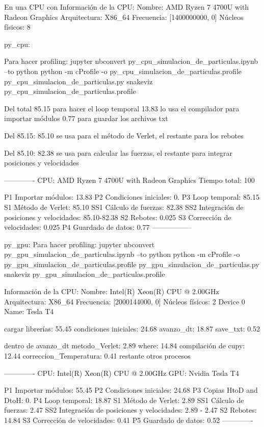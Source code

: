 \documentclass[aps,prb,twocolumn,superscriptaddress,floatfix,longbibliography]{revtex4-2}
\newcounter{para}
\begin{document}
\begin{itemize}
En una CPU con
Información de la CPU:
Nombre: AMD Ryzen 7 4700U with Radeon Graphics
Arquitectura: X86_64
Frecuencia: [1400000000, 0]
Núcleos físicos: 8

py_cpu:

Para hacer profiling:
jupyter nbconvert py_cpu_simulacion_de_particulas.ipynb --to python
python -m cProfile -o py_cpu_simulacion_de_particulas.profile py_cpu_simulacion_de_particulas.py
snakeviz py_cpu_simulacion_de_particulas.profile

Del total
85.15 para hacer el loop temporal
13.83 lo usa el compilador para importar módulos
0.77 para guardar los archivos txt

Del 85.15:
85.10 se usa para el método de Verlet, el restante para los rebotes

Del 85.10:
82.38 se usa para calcular las fuerzas, el restante para integrar posiciones y velocidades

-------------
CPU: AMD Ryzen 7 4700U with Radeon Graphics
Tiempo total: 100

P1 Importar módulos: 13.83
P2 Condiciones iniciales: 0.
P3 Loop temporal: 85.15
S1 Método de Verlet: 85.10
SS1 Cálculo de fuerzas: 82.38
SS2 Integración de posiciones y velocidades: 85.10-82.38
S2 Rebotes: 0.025
S3 Corrección de velocidades: 0.025
P4 Guardado de datos: 0.77
-----------------




py_gpu:
Para hacer profiling:
jupyter nbconvert py_gpu_simulacion_de_particulas.ipynb --to python
python -m cProfile -o py_gpu_simulacion_de_particulas.profile py_gpu_simulacion_de_particulas.py
snakeviz py_gpu_simulacion_de_particulas.profile

Información de la CPU:
Nombre: Intel(R) Xeon(R) CPU @ 2.00GHz
Arquitectura: X86_64
Frecuencia: [2000144000, 0]
Núcleos físicos: 2
Device 0 Name: Tesla T4

cargar librerías: 55.45 %
condiciones iniciales: 24.68%
avanzo_dt: 18.87 %
save_txt: 0.52 %

dentro de avanzo_dt
metodo_Verlet: 2.89%
where: 14.84 %
compilación de cupy: 12.44 %
correccion_Temperatura: 0.41%
restante otros procesos


-------------
CPU: Intel(R) Xeon(R) CPU @ 2.00GHz
GPU: Nvidia Tesla T4

P1 Importar módulos: 55.45
P2 Condiciones iniciales: 24.68
P3 Copias HtoD and DtoH: 0.
P4 Loop temporal: 18.87
S1 Método de Verlet: 2.89
SS1 Cálculo de fuerzas: 2.47
SS2 Integración de posiciones y velocidades: 2.89 - 2.47
S2 Rebotes: 14.84
S3 Corrección de velocidades: 0.41
P5 Guardado de datos: 0.52
-------------


\end{itemize}
\end{document}
